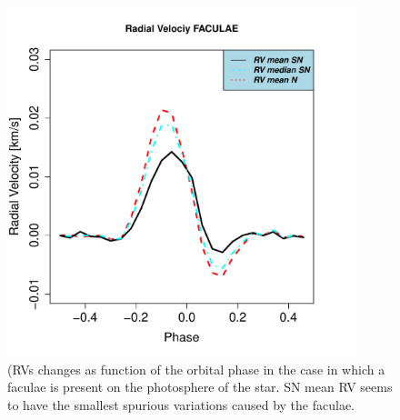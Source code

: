 \documentclass[11pt, oneside]{article}
\begin{document}
\begin{figure}[htbp]
   \centering
\includegraphics[height = 4in]{RV_comparison_FACULAE.pdf} 
\caption{(RVs changes as function of the orbital phase in the case in which a faculae is present on the photosphere of the star. SN mean RV seems to have the smallest spurious variations caused by the faculae.}
    \label{fig:faculae}
\end{figure}
\end{document}
